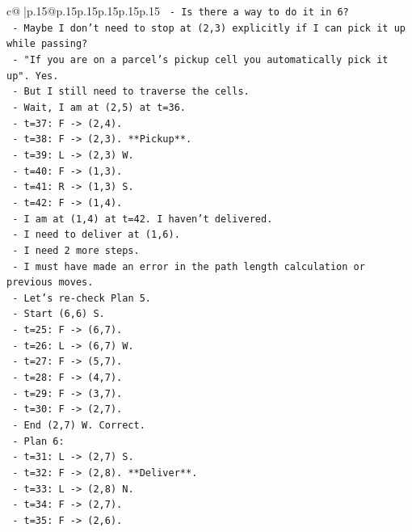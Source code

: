 \documentclass{article}
\begin{document}
{\begin{supertabular}{c@{$\;$}|p{.15\linewidth}@{}p{.15\linewidth}p{.15\linewidth}p{.15\linewidth}p{.15\linewidth}p{.15\linewidth}}
{{{\texttt{  {-} Is there a way to do it in 6?} \\
\texttt{  {-} Maybe I don't need to stop at (2,3) explicitly if I can pick it up while passing?} \\
\texttt{  {-} "If you are on a parcel's pickup cell you automatically pick it up". Yes.} \\
\texttt{  {-} But I still need to traverse the cells.} \\
\texttt{  {-} Wait, I am at (2,5) at t=36.} \\
\texttt{  {-} t=37: F {-}> (2,4).} \\
\texttt{  {-} t=38: F {-}> (2,3). **Pickup**.} \\
\texttt{  {-} t=39: L {-}> (2,3) W.} \\
\texttt{  {-} t=40: F {-}> (1,3).} \\
\texttt{  {-} t=41: R {-}> (1,3) S.} \\
\texttt{  {-} t=42: F {-}> (1,4).} \\
\texttt{  {-} I am at (1,4) at t=42. I haven't delivered.} \\
\texttt{  {-} I need to deliver at (1,6).} \\
\texttt{  {-} I need 2 more steps.} \\
\texttt{  {-} I must have made an error in the path length calculation or previous moves.} \\
\texttt{  {-} Let's re{-}check Plan 5.} \\
\texttt{  {-} Start (6,6) S.} \\
\texttt{  {-} t=25: F {-}> (6,7).} \\
\texttt{  {-} t=26: L {-}> (6,7) W.} \\
\texttt{  {-} t=27: F {-}> (5,7).} \\
\texttt{  {-} t=28: F {-}> (4,7).} \\
\texttt{  {-} t=29: F {-}> (3,7).} \\
\texttt{  {-} t=30: F {-}> (2,7).} \\
\texttt{  {-} End (2,7) W. Correct.} \\
\texttt{  {-} Plan 6:} \\
\texttt{  {-} t=31: L {-}> (2,7) S.} \\
\texttt{  {-} t=32: F {-}> (2,8). **Deliver**.} \\
\texttt{  {-} t=33: L {-}> (2,8) N.} \\
\texttt{  {-} t=34: F {-}> (2,7).} \\
\texttt{  {-} t=35: F {-}> (2,6).} \\
}}}
\end{supertabular}}
\end{document}

